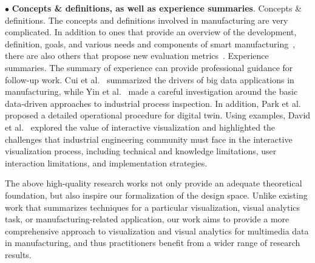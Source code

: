 \documentclass[a4paper,fleqn]{cas-dc}
\begin{document}
$\bullet$ \textbf{Concepts \& definitions, as well as experience summaries}.
 Concepts \& definitions. The concepts and definitions involved in manufacturing are very complicated. In addition to ones that provide an overview of the development, definition, goals, and various needs and components of smart manufacturing~\cite{Qu2020}, there are also others that propose new evaluation metrics~\cite{Baboli2021}.
 Experience summaries. The summary of experience can provide professional guidance for follow-up work. Cui et al.~\cite{Cui2020} summarized the drivers of big data applications in manufacturing, while Yin et al.~\cite{Yin2014} made a careful investigation around the basic data-driven approaches to industrial process inspection. In addition, Park et al.~\cite{Park2020} proposed a detailed operational procedure for digital twin.
Using examples, David et al.~\cite{FontVivanco2019} explored the value of interactive visualization and highlighted the challenges that industrial engineering community must face in the interactive visualization process, including technical and knowledge limitations, user interaction limitations, and implementation strategies. 

The above high-quality research works not only provide an adequate theoretical foundation, but also inspire our formalization of the design space. Unlike existing work that summarizes techniques for a particular visualization, visual analytics task, or manufacturing-related application, our work aims to provide a more comprehensive approach to visualization and visual analytics for multimedia data in manufacturing, and thus practitioners benefit from a wider range of research results.
   
 
\end{document}
